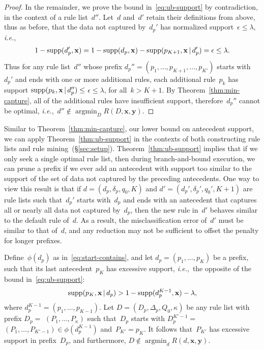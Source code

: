 \documentclass[twoside,11pt]{article}
\def\ie{{\it i.e.},~}
\newcommand{\x}{\mathbf{x}}
\newcommand{\y}{\mathbf{y}}
\def\RL{{d}}
\def\Prefix{d_p}
\def\Labels{\delta_p}
\def\Default{q_0}
\def\RLB{{D}}
\def\PrefixB{D_p}
\def\LabelsB{\Delta_p}
\def\DefaultB{Q_0}
\def\Obj{R}
\def\Reg{{\lambda}}
\def\Supp{\textnormal{supp}}
\def\StartContains{\phi}
\DeclareMathOperator*{\argmin}{argmin}
\newcommand{\given}{\,|\,}
\begin{document}
\begin{proof}
In the remainder, we prove the bound in~\eqref{eq:ub-support} by contradiction,
in the context of a rule list~$\RL''$.
%
Let~$\RL$ and~$\RL'$ retain their definitions from above,
thus as before, that the data not captured by~$\Prefix'$
has normalized support~${\epsilon \le \Reg}$, \ie
\begin{align*}
1 - \Supp(\Prefix', \x) = 1 - \Supp(\Prefix, \x) - \Supp(p_{K+1}, \x \given \Prefix') = \epsilon \le \Reg.
\end{align*}
Thus for any rule list~$\RL''$ whose prefix
$\Prefix'' = (p_1, \dots, p_{K+1}, \dots, p_{K'})$ starts
with~$\Prefix'$ and ends with one or more additional rules,
each additional rule~$p_k$ has support
${\Supp(p_k, \x \given \Prefix'') \le}$ ${\epsilon \le \Reg}$,
for all~${k > K+1}$.
%
By Theorem~\ref{thm:min-capture},
all of the additional rules have insufficient support,
therefore~$\Prefix''$ cannot be optimal,
\ie ${\RL'' \notin \argmin_{\RLB} \Obj(\RLB, \x, \y)}$.
\end{proof}

Similar to Theorem~\ref{thm:min-capture}, our lower bound on
antecedent support, we can apply Theorem~\ref{thm:ub-support}
in the contexts of both constructing rule lists and
rule mining~(\S\ref{sec:setup}).
%
Theorem~\ref{thm:ub-support} implies that if we only seek a single
optimal rule list, then during branch-and-bound execution,
we can prune a prefix if we ever add an antecedent with support
too similar to the support of the set of data not captured by the
preceding antecedents.
%
One way to view this result is that if
${\RL = (\Prefix, \Labels, \Default, K)}$
and ${\RL' = (\Prefix', \Labels', \Default', K + 1)}$
are rule lists such that~$\Prefix'$ starts with~$\Prefix$
and ends with an antecedent that captures all or nearly all
data not captured by~$\Prefix$, then the new rule in~$\RL'$
behaves similar to the default rule of~$\RL$.
%
As a result, the misclassification error of~$\RL'$ must be
similar to that of~$\RL$, and any reduction may not be
sufficient to offset the penalty for longer prefixes.

\begin{proposition}
\label{prop:ub-support}
Define~$\StartContains(\Prefix)$ as in~\eqref{eq:start-contains},
and let ${\Prefix = (p_1, \dots, p_{K})}$ be a prefix,
such that its last antecedent~$p_{K}$ has excessive support,
\ie the opposite of the bound in~\eqref{eq:ub-support}:
\begin{align*}
\Supp(p_K, \x \given \Prefix) > 1 - \Supp(\Prefix^{K-1}, \x) - \Reg,
\end{align*}
where ${\Prefix^{K-1} = (p_1, \dots, p_{K-1})}$.
%
Let ${\RLB = (\PrefixB, \LabelsB, \DefaultB, \kappa)}$
be any rule list with prefix
${\PrefixB =}$ ${(P_1, \dots, P_{\kappa})}$
such that~$\PrefixB$ starts with ${\PrefixB^{K'-1} =}$
${(P_1, \dots, P_{K'-1}) \in \StartContains(\Prefix^{K-1})}$
and~${P_{K'} = p_{K}}$.
%
It follows that~$P_{K'}$ has excessive support in prefix~$\PrefixB$,
and furthermore, ${\RLB \notin \argmin_{\RL} \Obj(\RL, \x, \y)}$.
\end{proposition}
\end{document}

